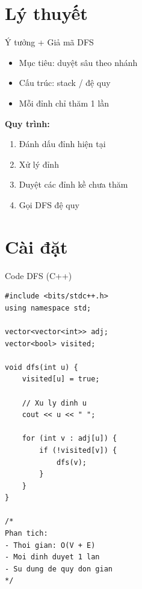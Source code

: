 \documentclass{beamer}
\begin{document}
\section{Lý thuyết}

\begin{frame}{Ý tưởng + Giả mã DFS}
\begin{tcolorbox}
\begin{itemize}
\item \faBullseye Mục tiêu: duyệt sâu theo nhánh
\item \faLayerGroup Cấu trúc: stack / đệ quy
\item \faCheckCircle Mỗi đỉnh chỉ thăm 1 lần
\end{itemize}
\end{tcolorbox}

\vspace{0.2cm}

\begin{tcolorbox}
\textbf{Quy trình:}
\begin{enumerate}
\item Đánh dấu đỉnh hiện tại
\item Xử lý đỉnh
\item Duyệt các đỉnh kề chưa thăm
\item Gọi DFS đệ quy
\end{enumerate}
\end{tcolorbox}
\end{frame}

\section{Cài đặt}

\begin{frame}[fragile]{Code DFS (C++)}
\begin{tcolorbox}
\begin{lstlisting}
#include <bits/stdc++.h>
using namespace std;

vector<vector<int>> adj;
vector<bool> visited;

void dfs(int u) {
    visited[u] = true;

    // Xu ly dinh u
    cout << u << " ";

    for (int v : adj[u]) {
        if (!visited[v]) {
            dfs(v);
        }
    }
}

/*
Phan tich:
- Thoi gian: O(V + E)
- Moi dinh duyet 1 lan
- Su dung de quy don gian
*/
\end{lstlisting}
\end{tcolorbox}
\end{frame}
\end{document}
